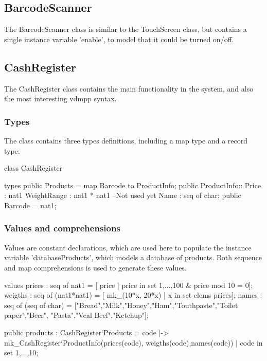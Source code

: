 \subsection{BarcodeScanner}
The BarcodeScanner class is similar to the TouchScreen class, but contains a single instance variable 'enable', to model that it could be turned on/off.


\subsection{CashRegister}
The CashRegister class contains the main functionality in the system, and also the most interesting vdmpp syntax.

\subsubsection{Types}
\vspace{-0.5cm}
The class contains three types definitions, including a map type and a record type:
\begin{vdmpp}
class CashRegister

types
 public Products = map Barcode to ProductInfo;
 public ProductInfo::  Price : nat1
            WeightRange : nat1 * nat1 --Not used yet
            Name : seq of char;
 public Barcode = nat1;
\end{vdmpp}

\subsubsection{Values and comprehensions}
\vspace{-0.5cm}
Values are constant declarations, which are used here to populate the instance variable 'databaseProducts', which models a database of products. Both sequence and map comprehensions is used to generate these values.
\begin{vdmpp}
values
 prices : seq of nat1 = [ price | price in set {1,...,100} & price mod 10 = 0];
 weigths : seq of (nat1*nat1) = [ mk_(10*x, 20*x) | x in set elems prices];
 names : seq of (seq of char) = ["Bread","Milk","Honey","Ham","Touthpaste","Toilet paper","Beer",
 																"Pasta","Veal Beef","Ketchup"];
 
 public products : CashRegister`Products = {code |-> mk_CashRegister`ProductInfo(prices(code),
 																					weigths(code),names(code)) | code in set {1,...,10}}; 
\end{vdmpp}

